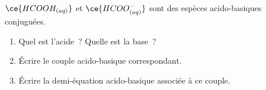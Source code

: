 $\ce{HCOOH_{(aq)}}$ et $\ce{HCOO^-_{(aq)}}$ sont des espèces acido-basiques
conjuguées.
\begin{enumerate}
    \item Quel est l'acide~? Quelle est la base~?
    \item Écrire le couple acido-basique correspondant.
    \item Écrire la demi-équation acido-basique associée à ce couple.
\end{enumerate}

